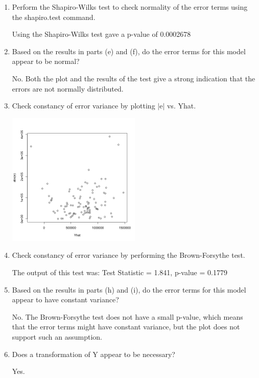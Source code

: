 \documentclass[11pt]{article}
\begin{document}
\begin{enumerate}
\begin{enumerate}
\item 
Perform the Shapiro-Wilks test to check normality of the error terms 
using the shapiro.test command.

Using the Shapiro-Wilks test gave a p-value of 0.0002678

\item 
Based on the results in parts (e) and (f), do the error terms for this 
model appear to be normal? 

No. Both the plot and the results of the test give a strong indication that 
the errors are not normally distributed. 

\item 
Check constancy of error variance by plotting $\left|\text{e}\right|$ vs. Yhat. 

\begin{center}
\includegraphics[width=0.5\textwidth]{Yhat_vs_abs_e}
\end{center}
	
\item 
Check constancy of error variance by performing the Brown-Forsythe test. 

The output of this test was: Test Statistic = 1.841, p-value = 0.1779

\item 
Based on the results in parts (h) and (i), do the error terms for this 
model appear to have constant variance? 

No. The Brown-Forsythe test does not have a small p-value, which means that 
the error terms might have constant variance, but the plot does not support 
such an assumption. 

\item 
Does a transformation of Y appear to be necessary? 

Yes.



\end{enumerate}
\end{enumerate}
\end{document}
